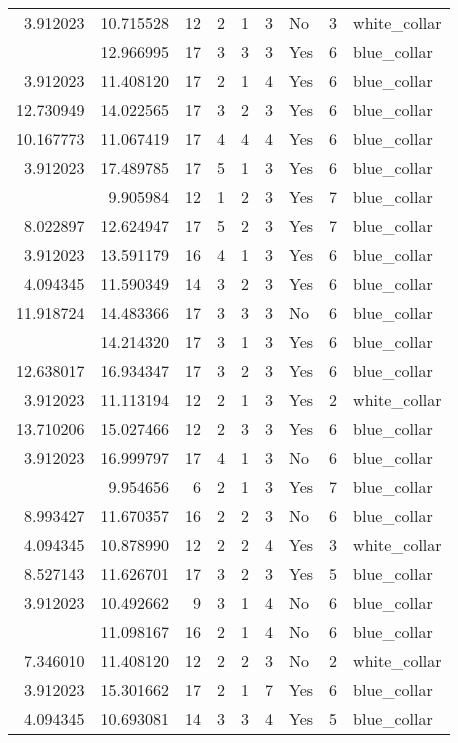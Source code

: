 \documentclass[
]{article}
\begin{document}
\begin{longtable}[t]{rrrrrllrl}
3.912023 & 10.715528 & 12 & 2 & 1 & 3 & No & 3 & white\_collar\\
\addlinespace
9.110520 & 12.966995 & 17 & 3 & 3 & 3 & Yes & 6 & blue\_collar\\
3.912023 & 11.408120 & 17 & 2 & 1 & 4 & Yes & 6 & blue\_collar\\
12.730949 & 14.022565 & 17 & 3 & 2 & 3 & Yes & 6 & blue\_collar\\
10.167773 & 11.067419 & 17 & 4 & 4 & 4 & Yes & 6 & blue\_collar\\
3.912023 & 17.489785 & 17 & 5 & 1 & 3 & Yes & 6 & blue\_collar\\
\addlinespace
11.849755 & 9.905984 & 12 & 1 & 2 & 3 & Yes & 7 & blue\_collar\\
8.022897 & 12.624947 & 17 & 5 & 2 & 3 & Yes & 7 & blue\_collar\\
3.912023 & 13.591179 & 16 & 4 & 1 & 3 & Yes & 6 & blue\_collar\\
4.094345 & 11.590349 & 14 & 3 & 2 & 3 & Yes & 6 & blue\_collar\\
11.918724 & 14.483366 & 17 & 3 & 3 & 3 & No & 6 & blue\_collar\\
\addlinespace
3.912023 & 14.214320 & 17 & 3 & 1 & 3 & Yes & 6 & blue\_collar\\
12.638017 & 16.934347 & 17 & 3 & 2 & 3 & Yes & 6 & blue\_collar\\
3.912023 & 11.113194 & 12 & 2 & 1 & 3 & Yes & 2 & white\_collar\\
13.710206 & 15.027466 & 12 & 2 & 3 & 3 & Yes & 6 & blue\_collar\\
3.912023 & 16.999797 & 17 & 4 & 1 & 3 & No & 6 & blue\_collar\\
\addlinespace
3.912023 & 9.954656 & 6 & 2 & 1 & 3 & Yes & 7 & blue\_collar\\
8.993427 & 11.670357 & 16 & 2 & 2 & 3 & No & 6 & blue\_collar\\
4.094345 & 10.878990 & 12 & 2 & 2 & 4 & Yes & 3 & white\_collar\\
8.527143 & 11.626701 & 17 & 3 & 2 & 3 & Yes & 5 & blue\_collar\\
3.912023 & 10.492662 & 9 & 3 & 1 & 4 & No & 6 & blue\_collar\\
\addlinespace
3.912023 & 11.098167 & 16 & 2 & 1 & 4 & No & 6 & blue\_collar\\
7.346010 & 11.408120 & 12 & 2 & 2 & 3 & No & 2 & white\_collar\\
3.912023 & 15.301662 & 17 & 2 & 1 & 7 & Yes & 6 & blue\_collar\\
4.094345 & 10.693081 & 14 & 3 & 3 & 4 & Yes & 5 & blue\_collar\\

\end{longtable}
\end{document}

